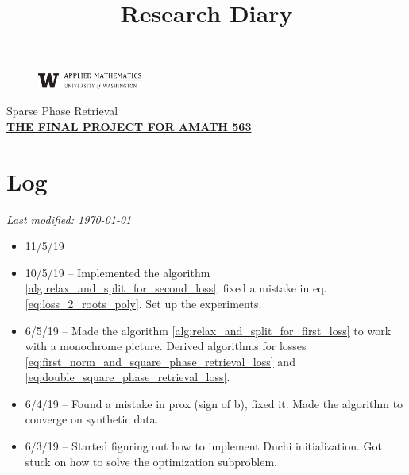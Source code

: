 \documentclass[11pt,letterpaper]{article}
\newcommand{\projectNameShort}{Sparse Phase Retrieval}
\newcommand{\projectNameLong}{The Final Project for AMATH 563}
\newcommand{\univlogo}{%
  \noindent %
  \begin{figure}
    \vspace{-24pt}
    \begin{center}
      \includegraphics[width=0.31\textwidth]{Images/univ-logo.jpg}
    \end{center}
    \vspace{-10pt}
  \end{figure}
}
\numberwithin{equation}{section} %
\numberwithin{figure}{section} %
\numberwithin{table}{section} %
\begin{document}
\title{Research Diary}
\univlogo
{\Huge \projectNameShort}\\[2mm]

{\large \underline{\textbf{\uppercase{\projectNameLong}}}}\\

\section*{Log}
\textit{Last modified: \today}
\begin{itemize}
    \item{11/5/19}
    \item{10/5/19} -- Implemented the algorithm \ref{alg:relax_and_split_for_second_loss}, fixed a mistake in eq. \ref{eq:loss_2_roots_poly}. Set up the experiments. 
    \item{6/5/19} -- Made the algorithm \ref{alg:relax_and_split_for_first_loss} to work with a monochrome picture. Derived algorithms for losses \ref{eq:first_norm_and_square_phase_retrieval_loss} and \ref{eq:double_square_phase_retrieval_loss}.
    \item{6/4/19} -- Found a mistake in prox (sign of b), fixed it. Made the algorithm to converge on synthetic data.
    \item 6/3/19 -- Started figuring out how to implement Duchi initialization. Got stuck on how to solve the optimization subproblem. 
\end{itemize}
\end{document}
